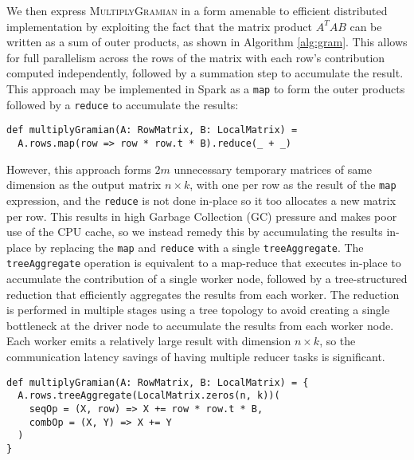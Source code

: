 We then express \textsc{MultiplyGramian} in a form amenable to efficient distributed implementation
by exploiting the fact that the matrix product $A^TAB$ can be written as a sum of outer products,
as shown in Algorithm \ref{alg:gram}. This allows for full parallelism across the rows of the matrix with
each row's contribution computed independently, followed by a summation step to accumulate the result.
This approach may be implemented in Spark as a \texttt{map} to form the outer products followed by a \texttt{reduce}
to accumulate the results:
\begin{verbatim}
def multiplyGramian(A: RowMatrix, B: LocalMatrix) =
  A.rows.map(row => row * row.t * B).reduce(_ + _)
\end{verbatim}
However, this approach forms $2m$ unnecessary temporary matrices of same dimension as the output matrix $n\times k$,
with one per row as the result of the \texttt{map} expression, and the \texttt{reduce} is not done in-place so it
too allocates a new matrix per row.
This results in high Garbage Collection (GC) pressure and makes poor use of the CPU cache, so
we instead remedy this by accumulating the results in-place by replacing the \texttt{map}
and \texttt{reduce} with a single \texttt{treeAggregate}.
The \texttt{treeAggregate} operation is equivalent to a map-reduce that executes in-place to accumulate the contribution of a
single worker node, followed by a
tree-structured reduction that efficiently aggregates the results from each worker.
The reduction is performed in multiple stages using a tree topology to avoid creating a single
bottleneck at the driver node to accumulate the results from each worker node.
Each worker emits a relatively large result with dimension $n\times k$, so the
communication latency savings of having multiple reducer tasks is significant.
\begin{verbatim}
def multiplyGramian(A: RowMatrix, B: LocalMatrix) = {
  A.rows.treeAggregate(LocalMatrix.zeros(n, k))(
    seqOp = (X, row) => X += row * row.t * B,
    combOp = (X, Y) => X += Y
  )
}
\end{verbatim}


